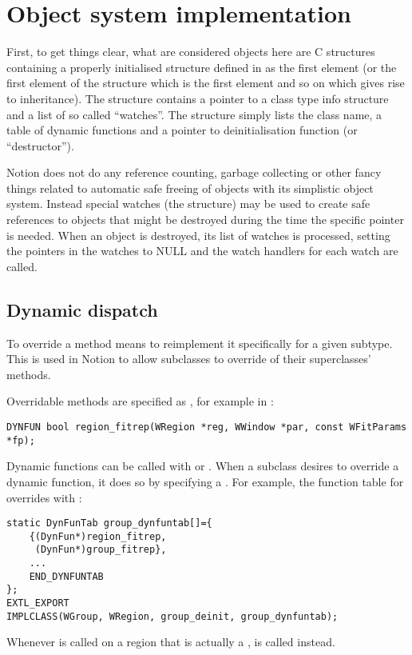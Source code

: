 \section{Object system implementation}

First, to get things clear, what are considered objects here are C
structures containing a properly initialised \type{}
structure defined in  as the first element (or the
first element of the structure which is the first element and so on which
gives rise to inheritance). The  structure contains a pointer
to a  class type info structure and
a list of so called ``watches''. The  structure simply
lists the class name, a table of dynamic functions and a pointer to
deinitialisation function (or ``destructor'').

Notion does not do any reference counting, garbage collecting or other
fancy things related to automatic safe freeing of objects with its
simplistic object system. Instead special watches (the 
 structure) may be used to create safe references to
objects that might be destroyed during the time the specific pointer is
needed. When an object is destroyed, its list of watches is processed,
setting the pointers in the watches to NULL and the watch handlers for
each watch are called. 

\subsection{Dynamic dispatch}

To override a method means to reimplement it specifically for a given subtype.
This is used in Notion to allow subclasses to override of their superclasses' 
methods.

Overridable methods are specified as , for example 
 in :

\begin{verbatim}
DYNFUN bool region_fitrep(WRegion *reg, WWindow *par, const WFitParams *fp);
\end{verbatim}

Dynamic functions can be called with  or .
When a subclass desires to override a dynamic function, it does so by 
specifying a . For example, the function
table for  overrides  with 
:

\begin{verbatim}
static DynFunTab group_dynfuntab[]={
    {(DynFun*)region_fitrep,
     (DynFun*)group_fitrep},
    ...
    END_DYNFUNTAB
};
EXTL_EXPORT
IMPLCLASS(WGroup, WRegion, group_deinit, group_dynfuntab);
\end{verbatim}

Whenever  is called on a region that is actually a 
,  is called instead.
